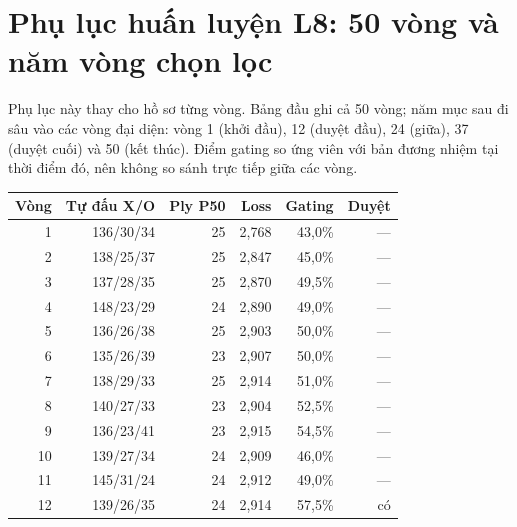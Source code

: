 \chapter{Phụ lục huấn luyện L8: 50 vòng và năm vòng chọn lọc}

\label{app:huan-luyen}

Phụ lục này thay cho hồ sơ từng vòng. Bảng đầu ghi cả 50 vòng; năm mục sau đi sâu vào các vòng đại diện: vòng 1 (khởi đầu), 12 (duyệt đầu), 24 (giữa), 37 (duyệt cuối) và 50 (kết thúc). Điểm gating so ứng viên với bản đương nhiệm tại thời điểm đó, nên không so sánh trực tiếp giữa các vòng.

\begin{center}\scriptsize\setlength{\tabcolsep}{3pt}

\begin{tabular}{@{}rrrrrr@{}}

\toprule

Vòng & Tự đấu X/O & Ply P50 & Loss & Gating & Duyệt \\

\midrule

1 & 136/30/34 & 25 & 2,768 & 43,0\% & — \\

2 & 138/25/37 & 25 & 2,847 & 45,0\% & — \\

3 & 137/28/35 & 25 & 2,870 & 49,5\% & — \\

4 & 148/23/29 & 24 & 2,890 & 49,0\% & — \\

5 & 136/26/38 & 25 & 2,903 & 50,0\% & — \\

6 & 135/26/39 & 23 & 2,907 & 50,0\% & — \\

7 & 138/29/33 & 25 & 2,914 & 51,0\% & — \\

8 & 140/27/33 & 23 & 2,904 & 52,5\% & — \\

9 & 136/23/41 & 23 & 2,915 & 54,5\% & — \\

10 & 139/27/34 & 24 & 2,909 & 46,0\% & — \\

11 & 145/31/24 & 24 & 2,912 & 49,0\% & — \\

12 & 139/26/35 & 24 & 2,914 & 57,5\% & có \\


\end{tabular}
\end{center}
